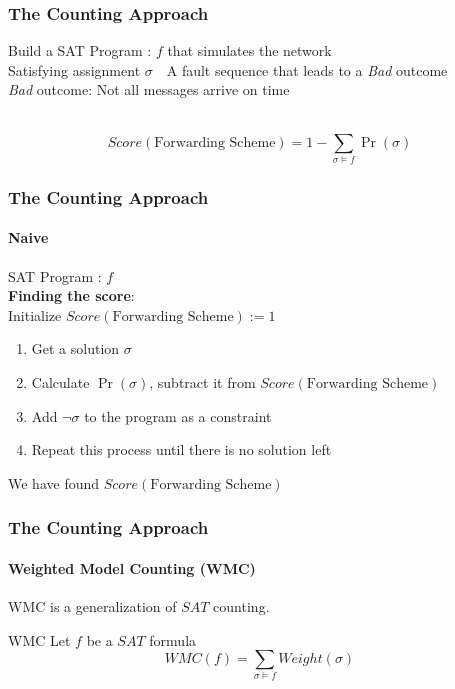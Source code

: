 \documentclass{beamer}
\begin{document}
\begin{frame}
\frametitle{The Counting Approach}
	Build a SAT Program : $ f $ that simulates the network\\[2ex]
	Satisfying assignment $\sigma$\ \leftrightarrow\ A fault sequence that leads to a \textit{Bad} outcome\\
	\textit{Bad} outcome: Not all messages arrive on time\\[3ex]
	\pause
	\begin{block}{$\ $}
	$$ Score(\text{Forwarding Scheme}) = 1-\sum_{\sigma \vDash f}\Pr(\sigma) $$
	\end{block}
\end{frame}

\begin{frame}
\frametitle{The Counting Approach}
\framesubtitle{Naive}

	SAT Program : $ f $ \\[3ex]
	\textbf{Finding the score}:\\
	Initialize $Score(\text{Forwarding Scheme}):=1$
	\begin{enumerate}
		\item Get a solution $\sigma$
		\item Calculate $\Pr(\sigma)$, subtract it from $Score(\text{Forwarding Scheme})$
		\item Add $\neg \sigma$ to the program as a constraint
		\item Repeat this process until there is no solution left\\[3ex]
	\end{enumerate}
	We have found $Score(\text{Forwarding Scheme})$
\end{frame}

\begin{frame}
\frametitle{The Counting Approach} %
\framesubtitle{Weighted Model Counting (WMC)}

	WMC is a generalization of $SAT$ counting.\\
	\begin{block}{WMC}
	Let $f$ be a $SAT$ formula
		$$WMC(f) = \sum_{\sigma \vDash f}Weight(\sigma)$$
	\end{block}
\end{frame}
\end{document}
